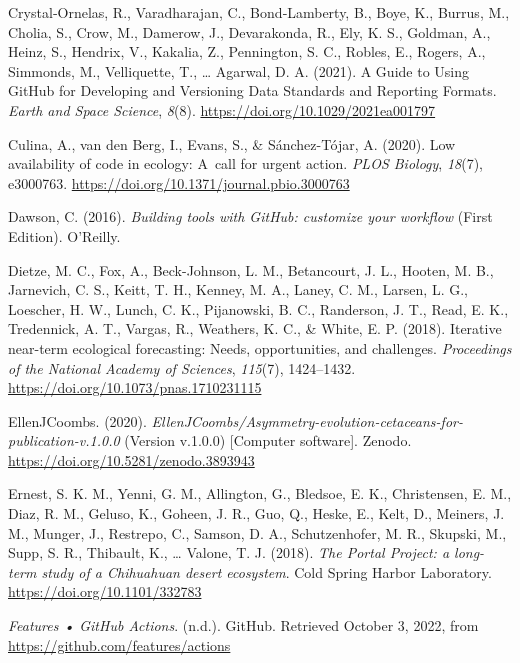 \begin{CSLReferences}{1}{0}
\leavevmode{}%
Crystal‐Ornelas, R., Varadharajan, C., Bond‐Lamberty, B., Boye, K., Burrus, M., Cholia, S., Crow, M., Damerow, J., Devarakonda, R., Ely, K. S., Goldman, A., Heinz, S., Hendrix, V., Kakalia, Z., Pennington, S. C., Robles, E., Rogers, A., Simmonds, M., Velliquette, T., \ldots{} Agarwal, D. A. (2021). A Guide to Using GitHub for Developing and Versioning Data Standards and Reporting Formats. \emph{Earth and Space Science}, \emph{8}(8). \url{https://doi.org/10.1029/2021ea001797}

\leavevmode{}%
Culina, A., van den Berg, I., Evans, S., \& Sánchez-Tójar, A. (2020). Low availability of code in ecology: A~call for urgent action. \emph{PLOS Biology}, \emph{18}(7), e3000763. \url{https://doi.org/10.1371/journal.pbio.3000763}

\leavevmode{}%
Dawson, C. (2016). \emph{Building tools with GitHub: customize your workflow} (First Edition). O'Reilly.

\leavevmode{}%
Dietze, M. C., Fox, A., Beck-Johnson, L. M., Betancourt, J. L., Hooten, M. B., Jarnevich, C. S., Keitt, T. H., Kenney, M. A., Laney, C. M., Larsen, L. G., Loescher, H. W., Lunch, C. K., Pijanowski, B. C., Randerson, J. T., Read, E. K., Tredennick, A. T., Vargas, R., Weathers, K. C., \& White, E. P. (2018). Iterative near-term ecological forecasting: Needs, opportunities, and challenges. \emph{Proceedings of the National Academy of Sciences}, \emph{115}(7), 1424--1432. \url{https://doi.org/10.1073/pnas.1710231115}

\leavevmode{}%
EllenJCoombs. (2020). \emph{EllenJCoombs/Asymmetry-evolution-cetaceans-for-publication-v.1.0.0} (Version v.1.0.0) {[}Computer software{]}. Zenodo. \url{https://doi.org/10.5281/zenodo.3893943}

\leavevmode{}%
Ernest, S. K. M., Yenni, G. M., Allington, G., Bledsoe, E. K., Christensen, E. M., Diaz, R. M., Geluso, K., Goheen, J. R., Guo, Q., Heske, E., Kelt, D., Meiners, J. M., Munger, J., Restrepo, C., Samson, D. A., Schutzenhofer, M. R., Skupski, M., Supp, S. R., Thibault, K., \ldots{} Valone, T. J. (2018). \emph{The Portal Project: a long-term study of a Chihuahuan desert ecosystem}. Cold Spring Harbor Laboratory. \url{https://doi.org/10.1101/332783}

\leavevmode{}%
\emph{Features • GitHub Actions}. (n.d.). GitHub. Retrieved October 3, 2022, from \url{https://github.com/features/actions}


\end{CSLReferences}

